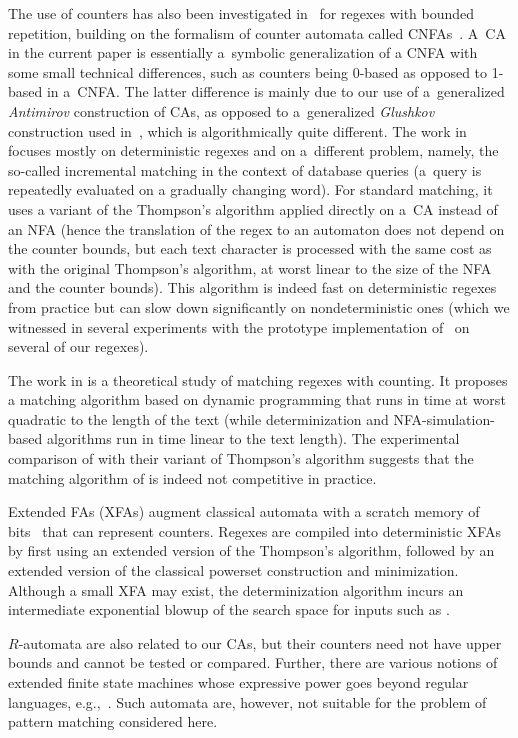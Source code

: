 \documentclass[acmsmall,screen]{acmart}
\begin{document}
The use of counters has also been investigated in~\cite{cikm15} for
regexes with bounded repetition, building on the
formalism of counter automata called CNFAs~\cite{GGM12}. 
%
A~CA in the current paper is essentially a~symbolic generalization of a CNFA
with some small technical differences, such as counters being 0-based as opposed
to 1-based in a~CNFA.
The latter difference is mainly due to our use of
a~generalized \emph{Antimirov} construction of CAs, 
as opposed to a~generalized \emph{Glushkov} construction used
in~\cite{GGM12}, which is algorithmically quite different.
%
The work in~\cite{cikm15} focuses mostly on deterministic regexes and on
a~different problem, namely, the so-called incremental matching in the context
of database queries (a~query is repeatedly evaluated on a gradually changing
word).
%
For standard matching, it uses a variant of the Thompson's algorithm applied
directly on a~CA instead of an NFA (hence the translation of the regex to an
automaton does not depend on the counter bounds, but each text character
is processed with the same cost as with the original Thompson's algorithm, at
worst linear to the size of the NFA and the counter bounds).
This algorithm is indeed fast on deterministic regexes from practice but can
slow down significantly on nondeterministic ones (which we witnessed in several
experiments with the prototype implementation of~\cite{cikm15} on several of our
regexes).

The work in \cite{KT03} is a theoretical study of matching regexes with
counting. It proposes a matching algorithm based on dynamic programming that
runs in time at worst quadratic to the length of the text (while determinization
and NFA-simulation-based algorithms run in time linear to the text length). The
experimental comparison of \cite{cikm15} with their variant of Thompson's
algorithm suggests that the matching algorithm of \cite{KT03} is indeed not
competitive in practice.

Extended FAs (XFAs) augment classical automata with a scratch memory of
bits~\cite{SEJ08,jha_extended} that can represent counters.
%
Regexes are compiled into deterministic XFAs by first using an extended version
of the Thompson's algorithm, followed by an extended version of the
classical powerset construction and minimization.
%
Although a small XFA may exist, the determinization algorithm incurs an
intermediate exponential blowup of the search space for inputs such as
.

$R$-automata \cite{abdulla_rautomata} are also related to our CAs, but their
counters need not have upper bounds and cannot be tested or compared.
%
Further, there are various notions of extended finite state machines whose
expressive power goes beyond regular languages,
e.g.,~\cite{cheng_efsm,shiple_efsm,jha_extended,finkel_fast}.
%
Such automata are, however, not suitable for the problem of pattern matching
considered here.
\end{document}
